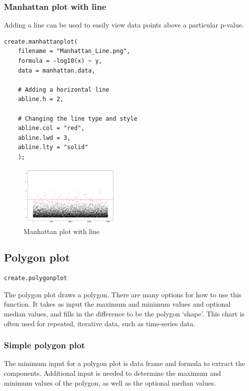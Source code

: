 \documentclass[letterpaper]{article}
\begin{document}
\subsubsection{Manhattan plot with line}
Adding a line can be used to easily view data points above a particular p-value.

\begin{verbatim}
create.manhattanplot(
    filename = "Manhattan_Line.png",
    formula = -log10(x) ~ y,
    data = manhattan.data,
    
    # Adding a horizontal line
    abline.h = 2,
    
    # Changing the line type and style
    abline.col = "red",
    abline.lwd = 3,
    abline.lty = "solid"
    );
\end{verbatim}

\begin{figure}[!ht]
  \begin{center}
     \includegraphics[width=50mm]{Figures/Manhattan_Line.png}
     \caption{Manhattan plot with line}
  \end{center}
\end{figure}


\subsection{Polygon plot}
\begin{verbatim}
create.polygonplot
\end{verbatim}

The polygon plot draws a polygon. There are many options for how to use this function. It takes as input the maximum and minimum values and optional median values, and fills in the difference to be the polygon `shape'. This chart is often used for repeated, iterative data, such as time-series data.

\subsubsection{Simple polygon plot}
The minimum input for a polygon plot is data frame and formula to extract the components. Additional input is needed to determine the maximum and minimum values of the polygon, as well as the optional median values.
\end{document}
